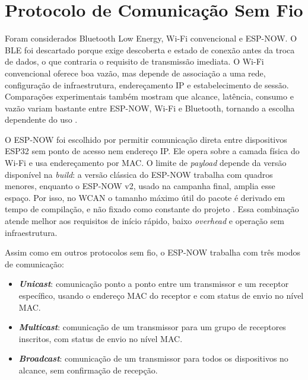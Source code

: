 \section{Protocolo de Comunicação Sem Fio}

Foram considerados Bluetooth Low Energy, Wi-Fi convencional e ESP-NOW. O BLE foi
descartado porque exige descoberta e estado de conexão antes da troca de dados, o
que contraria o requisito de transmissão imediata. O Wi-Fi convencional oferece boa
vazão, mas depende de associação a uma rede, configuração de infraestrutura,
endereçamento IP e estabelecimento de sessão. Comparações experimentais também
mostram que alcance, latência, consumo e vazão variam bastante entre ESP-NOW,
Wi-Fi e Bluetooth, tornando a escolha dependente do uso \cite{eridani2021_espnow_wifi_bluetooth}.

O ESP-NOW foi escolhido por permitir comunicação direta entre dispositivos ESP32 sem
ponto de acesso nem endereço IP. Ele opera sobre a camada física do Wi-Fi e usa
endereçamento por MAC. O limite de \emph{payload} depende da versão disponível na
\emph{build}: a versão clássica do ESP-NOW trabalha com quadros menores, enquanto
o ESP-NOW v2, usado na campanha final, amplia esse espaço. Por isso, no WCAN o
tamanho máximo útil do pacote é derivado em tempo de compilação, e não fixado como
constante do projeto \cite{espressif_espnow_programming_guide,pasic2021_espnow_esp32}.
Essa combinação atende melhor aos requisitos de início rápido, baixo \emph{overhead} e
operação sem infraestrutura.

Assim como em outros protocolos sem fio, o ESP-NOW trabalha com três modos de comunicação:
\begin{itemize}
    \item \textbf{\emph{Unicast}}: comunicação ponto a ponto entre um transmissor e um receptor específico, 
    usando o endereço MAC do receptor e com status de envio no nível MAC.
    \item \textbf{\emph{Multicast}}: comunicação de um transmissor para um grupo de receptores inscritos, 
    com status de envio no nível MAC.
    \item \textbf{\emph{Broadcast}}: comunicação de um transmissor para todos os dispositivos no alcance, 
    sem confirmação de recepção.
\end{itemize}

